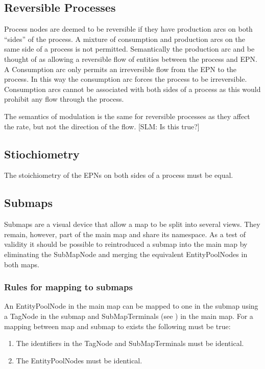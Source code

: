 \subsection{Reversible Processes}
\label{sec: semantics reversible procs}

Process nodes are deemed to be reversible if they have production arcs on both ``sides'' of the process. A mixture of consumption and production arcs on the same side of a process is not permitted. Semantically the production arc and be thought of as allowing a reversible flow of entities between the process and EPN. A Consumption arc only permits an irreversible flow from the EPN to the process. In this way the consumption arc forces the process to be irreversible. Consumption arcs cannot be associated with both sides of a process as this would prohibit any flow through the process.

The semantics of modulation is the same for reversible processes as they affect the rate, but not the direction of the flow. [SLM: Is this true?]

\subsection{Stiochiometry}

The stoichiometry of the EPNs on both sides of a process must be equal.

\subsection{Submaps}

Submaps are a visual device that allow a map to be split into several
views. They remain, however, part of the main map and share its
namespace. As a test of validity it should be possible to reintroduced
a submap into the main map by eliminating the SubMapNode and merging
the equivalent EntityPoolNodes in both maps.

\subsubsection{Rules for mapping to submaps}

An EntityPoolNode in the main map can be mapped to one in the submap
using a TagNode in the submap and SubMapTerminals (see ) in the main map. For a
mapping between map and submap to exists the following must be true:

\begin{enumerate}
\item The identifiers in the TagNode and SubMapTerminals must be identical.
\item The EntityPoolNodes must be identical.
\end{enumerate}

